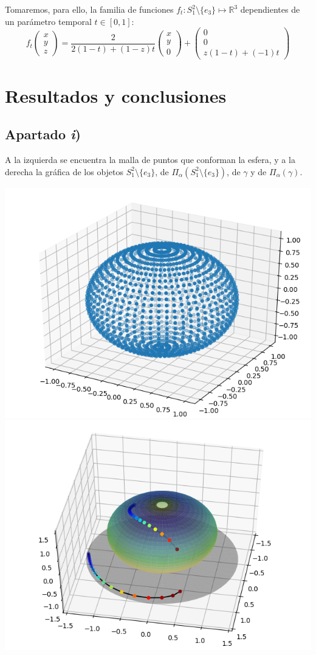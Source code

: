 \documentclass[a4paper]{article}
\begin{document}
	Tomaremos, para ello, la familia de funciones $f_t:S_1^2\setminus\{e_3\}\mapsto\mathbb{R}^3$ dependientes de un parámetro temporal $t\in[0,1]$: 
	\[ f_t\left(\begin{matrix}x\\y\\z\end{matrix}\right) = \frac{2}{2(1-t)+(1-z)t}\left(\begin{matrix}x\\y\\0\end{matrix}\right)+\left(\begin{matrix}0\\0\\z(1-t)+(-1)t\end{matrix}\right) \]
	
	\section{Resultados y conclusiones}
	
	\subsection{Apartado \textit{i})}
	A la izquierda se encuentra la malla de puntos que conforman la esfera, y a la derecha la gráfica de los objetos $S_1^2\setminus\{e_3\}$, de $\Pi_\alpha\left(S_1^2\setminus\{e_3\}\right)$, de $\gamma$ y de $\Pi_\alpha\left(\gamma\right)$.
	
	\begin{center}
		\includegraphics[width=0.45\linewidth]{0} 
		\hfill
		\includegraphics[width=0.45\linewidth]{1} 
	\end{center}	
\end{document}
